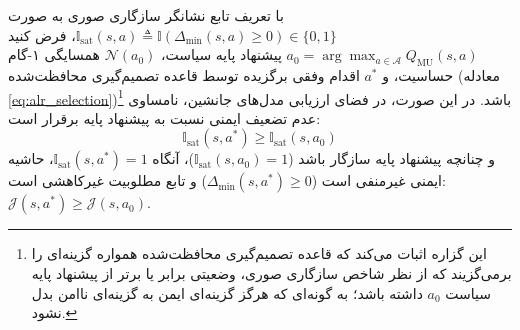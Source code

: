 \documentclass[oneside,openany,phd]{TMU-Thesis}
\begin{document}
\begin{proposition}
\label{prop:safety_preservation}
با تعریف تابع نشانگر سازگاری صوری به صورت $\mathbb{I}_{\text{sat}}(s, a) \triangleq \mathbb{I}(\Delta_{\min}(s, a) \ge 0) \in \{0, 1\}$، فرض کنید $a_0 = \arg\max_{a \in \mathcal{A}} Q_{\text{MU}}(s, a)$ پیشنهاد پایه سیاست، $\mathcal{N}(a_0)$ همسایگی ۱-گام حساسیت، و $a^*$ اقدام وفقی برگزیده توسط قاعده تصمیم‌گیری محافظت‌شده (معادله \ref{eq:alr_selection})\footnote{این گزاره اثبات می‌کند که قاعده تصمیم‌گیری محافظت‌شده همواره گزینه‌ای را برمی‌گزیند که از نظر شاخص سازگاری صوری، وضعیتی برابر یا برتر از پیشنهاد پایه سیاست $a_0$ داشته باشد؛ به گونه‌ای که هرگز گزینه‌ای ایمن به گزینه‌ای ناامن بدل نشود.} باشد. در این صورت، در فضای ارزیابی مدل‌های جانشین، نامساوی عدم تضعیف ایمنی نسبت به پیشنهاد پایه برقرار است:
\begin{equation}
\label{eq:app_invariant3_formal}
\mathbb{I}_{\text{sat}}(s, a^*) \ge \mathbb{I}_{\text{sat}}(s, a_0)
\end{equation}
و چنانچه پیشنهاد پایه سازگار باشد ($\mathbb{I}_{\text{sat}}(s, a_0) = 1$)، آنگاه $\mathbb{I}_{\text{sat}}(s, a^*) = 1$، حاشیه ایمنی غیرمنفی است ($\Delta_{\min}(s, a^*) \ge 0$) و تابع مطلوبیت غیرکاهشی است: $\mathcal{J}(s, a^*) \ge \mathcal{J}(s, a_0)$.


\end{proposition}
\end{document}
